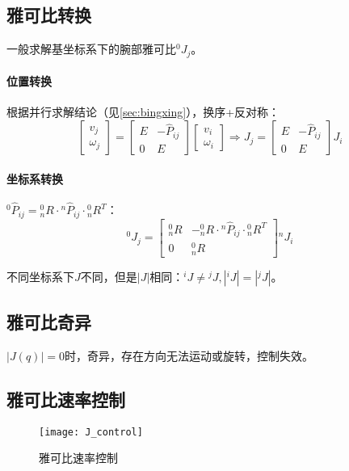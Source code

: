 \documentclass[
12pt, %
a4paper, 
oneside, %
headinclude,footinclude, %
]{scrartcl}
\begin{document}
\subsection[雅可比转换]{雅可比转换}\label{sec:Jacobian transform}\label{sec:bingxing_back1}
一般求解基坐标系下的腕部雅可比$ ^0 J_j $。
\paragraph{位置转换}
根据并行求解结论（见\ref{sec:bingxing}），换序+反对称：
$$ \begin{bmatrix} v_j \\ \omega_j \end{bmatrix} = \begin{bmatrix} E & -\hat{P}_{ij} \\ 0 & E \end{bmatrix} \begin{bmatrix} v_i \\ \omega_i \end{bmatrix} \Rightarrow J_j = \begin{bmatrix} E & -\hat{P}_{ij} \\ 0 & E \end{bmatrix} J_i $$ 
\paragraph{坐标系转换}
$ {}^0 \hat{P}_{ij} = {}^0_n R \cdot {}^n \hat{P}_{ij} \cdot {}^0_n R^T $：
$$ {}^0 J_j = \begin{bmatrix} {}^0_n R & -{}^0_n R \cdot {}^n \hat{P}_{ij} \cdot {}^0_n R^T \\ 0 & {}^0_n R \end{bmatrix} {}^n J_i $$

不同坐标系下$ J $不同，但是$ |J| $相同：$ {}^i J \neq {}^j J, |{}^i J| = |{}^j J| $。
\subsection[雅可比奇异]{雅可比奇异}
$ |J(q)| = 0 $时，奇异，存在方向无法运动或旋转，控制失效。
\subsection[雅可比速率控制]{雅可比速率控制}
\begin{figure}[H]
\centering 
\texttt{[image: J\_control]} 
\caption{雅可比速率控制}
\end{figure}
\end{document}
